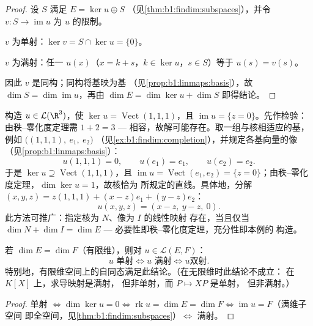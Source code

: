 \begin{proof}
设 $S$ 满足 $E = \ker u \oplus S$
（见\cref{thm:b1:findim:subspaces}），并令 $v \colon S \to
\operatorname{im} u$ 为 $u$ 的限制。

$v$ 为单射：$\ker v = S \cap \ker u = \{0\}$。

$v$ 为满射：任一 $u(x)$（$x = k + s$，$k \in \ker u$，$s
\in S$）等于 $u(s) = v(s)$。

因此 $v$ 是同构；同构将基映为基
（见\cref{prop:b1:linmaps:basis}），故 $\dim S = \dim\operatorname{im}
u$，再由 $\dim E = \dim\ker u + \dim S$ 即得结论。
\end{proof}

\begin{example}[按指定要求构造映射]
\label{ex:b1:linmaps:tospec}
构造 $u \in \mathcal{L}(\R^3)$，使 $\ker u =
\operatorname{Vect}(1,1,1)$，且 $\operatorname{im} u = \{z =
0\}$。先作检验：由秩--零化度定理需 $1 + 2 = 3$ ---
相容，故解可能存在。取一组与核相适应的基，
例如 $\bigl((1,1,1),\ e_1,\ e_2\bigr)$
（见\cref{ex:b1:findim:completion}），并规定各基向量的像
（见\cref{prop:b1:linmaps:basis}）：
\[
u(1,1,1) = 0, \qquad u(e_1) = e_1, \qquad u(e_2) = e_2 .
\]
于是 $\ker u \supseteq \operatorname{Vect}(1,1,1)$，且
$\operatorname{im} u = \operatorname{Vect}(e_1, e_2) = \{z =
0\}$；由秩--零化度定理，$\dim\ker u = 1$，故核恰为
所规定的直线。具体地，分解 $(x, y, z)
= z(1,1,1) + (x - z)e_1 + (y - z)e_2$：
\[
u(x, y, z) = (x - z,\ y - z,\ 0).
\]
此方法可推广：指定核为 $N$、像为 $I$ 的线性映射
存在，当且仅当 $\dim N + \dim I = \dim E$
--- 必要性即秩--零化度定理，充分性即本例的
构造。
\end{example}

\begin{corollary}\label{cor:b1:linmaps:samedim}
若 $\dim E = \dim F$（有限维），则对 $u \in \mathcal{L}(E, F)$：
\[
u \text{ 单射} \iff u \text{ 满射} \iff u \text{
双射}.
\]
特别地，有限维空间上的自同态满足此结论。（在无限维时此结论不成立：
在 $K[X]$ 上，求导映射是满射，
但非单射，而 $P \mapsto XP$ 是单射，
但非满射。）
\end{corollary}

\begin{proof}
单射 $\iff \dim\ker u = 0 \iff \operatorname{rk} u = \dim E =
\dim F \iff \operatorname{im} u = F$（满维子空间
即全空间，见\cref{thm:b1:findim:subspaces}）$\iff$ 满射。
\end{proof}

